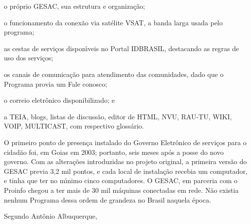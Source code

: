\documentclass[
12pt,		%
openright,	%
twoside,  %
a4paper,			%
chapter=TITLE,		%
english,			%
french,				%
spanish,			%
brazil				%
]{USPSC-classe/USPSC}
\begin{document}
\begin{alineas}
\item o pr\'oprio GESAC, sua estrutura e organiza\c{c}\~ao;
\item o funcionamento da conex\~ao via sat\'elite VSAT, a banda larga usada pelo programa;
\item as cestas de servi\c{c}os dispon\'{\i}veis no Portal IDBRASIL, destacando as regras de uso dos servi\c{c}os;
\item os canais de comunica\c{c}\~ao para atendimento das comunidades, dado que o Programa provia um \textquotedbl Fale conosco\textquotedbl ;
\item  o correio eletr\^onico disponibilizado; e
\item a TEIA, blogs, listas de discuss\~ao, editor de HTML, NVU, RAU-TU, WIKI, VOIP, MULTICAST, com respectivo gloss\'ario.
\end{alineas}


\noindent\begin{center}\mbox{\centering{}}\end{center}


O primeiro ponto de presen\c{c}a instalado do Governo Eletr\^onico de servi\c{c}os para o cidad\~ao foi, em Goias em 2003; portanto, seis meses ap\'os a posse do novo governo. Com as altera\c{c}\~oes introduzidas no projeto original, a primeira vers\~ao do GESAC previa 3,2 mil pontos, e cada local de instala\c{c}\~ao recebia um computador, e tinha que ter no m\'{\i}nimo cinco computadores. O GESAC, em parceria com o Proinfo chegou a ter mais de 30 mil m\'aquinas conectadas em rede. N\~ao existia nenhum Programa dessa ordem de grandeza no Brasil naquela \'epoca.









Segundo Ant\^onio Albuquerque,
\end{document}
